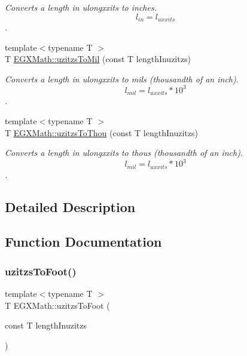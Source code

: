 \begin{DoxyCompactItemize}
\begin{DoxyCompactList}\small\item\em Converts a length in ulongxxits to inches. \[ l_{in}=l_{uxxits} \]. \end{DoxyCompactList}\item 
{\footnotesize template$<$typename T $>$ }\\T \mbox{\hyperlink{group___e_g_x_math-_conversions-_length_conversions-uzitzs-_imperial_ga53d4abecb2e7ac39c15c4ef89b9447a9}{E\+G\+X\+Math\+::uzitzs\+To\+Mil}} (const T length\+Inuzitzs)
\begin{DoxyCompactList}\small\item\em Converts a length in ulongxxits to mils (thousandth of an inch). \[ l_{mil}=l_{uxxits} * 10^{3} \]. \end{DoxyCompactList}\item 
{\footnotesize template$<$typename T $>$ }\\T \mbox{\hyperlink{group___e_g_x_math-_conversions-_length_conversions-uzitzs-_imperial_gaa11694f9026bf30e29bd716a35c05b4e}{E\+G\+X\+Math\+::uzitzs\+To\+Thou}} (const T length\+Inuzitzs)
\begin{DoxyCompactList}\small\item\em Converts a length in ulongxxits to thous (thousandth of an inch). \[ l_{mil}=l_{uxxits} * 10^{3} \]. \end{DoxyCompactList}\end{DoxyCompactItemize}


\subsection{Detailed Description}


\subsection{Function Documentation}
\mbox{\label{group___e_g_x_math-_conversions-_length_conversions-uzitzs-_imperial_gaafdc16c327535a3ea42909a5ebadac71}} 
\subsubsection{\texorpdfstring{uzitzs\+To\+Foot()}{uzitzsToFoot()}}
{\footnotesize\ttfamily template$<$typename T $>$ \\
T E\+G\+X\+Math\+::uzitzs\+To\+Foot (\begin{DoxyParamCaption}\item[{const T}]{length\+Inuzitzs }\end{DoxyParamCaption})}



